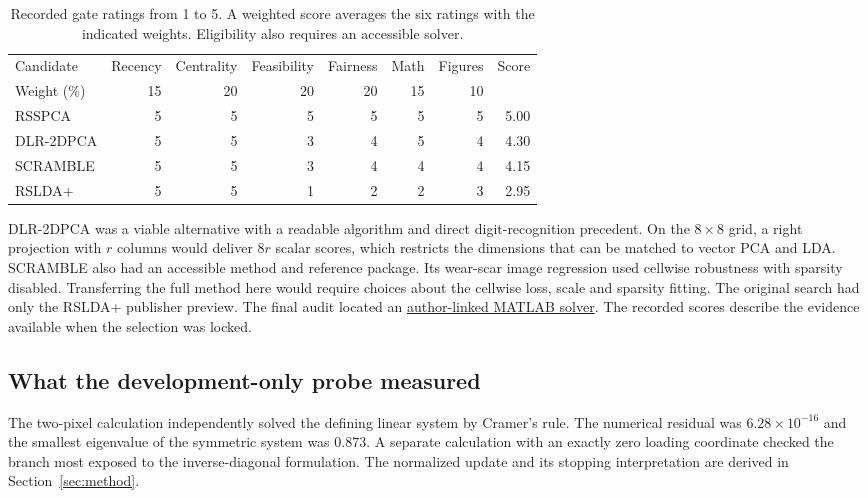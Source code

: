 \documentclass[11pt,a4paper]{article}
\begin{document}
\begin{table}[H]\small\centering
\caption{Recorded gate ratings from 1 to 5. A weighted score averages the six ratings with the indicated weights. Eligibility also requires an accessible solver.}
\label{tab:gate-scores}
\setlength{\tabcolsep}{5pt}
\begin{tabular}{@{}lrrrrrrr@{}}
\toprule
Candidate & Recency & Centrality & Feasibility & Fairness & Math & Figures & Score\\
Weight (\%) & 15 & 20 & 20 & 20 & 15 & 10 & \\
\midrule
RSSPCA & 5 & 5 & 5 & 5 & 5 & 5 & 5.00\\
DLR-2DPCA & 5 & 5 & 3 & 4 & 5 & 4 & 4.30\\
SCRAMBLE & 5 & 5 & 3 & 4 & 4 & 4 & 4.15\\
RSLDA+ & 5 & 5 & 1 & 2 & 2 & 3 & 2.95\\
\bottomrule
\end{tabular}
\end{table}

DLR-2DPCA was a viable alternative with a readable algorithm and direct digit-recognition precedent. On the $8\times8$ grid, a right projection with $r$ columns would deliver $8r$ scalar scores, which restricts the dimensions that can be matched to vector PCA and LDA. SCRAMBLE also had an accessible method and reference package. Its wear-scar image regression used cellwise robustness with sparsity disabled. Transferring the full method here would require choices about the cellwise loss, scale and sparsity fitting. The original search had only the RSLDA+ publisher preview. The final audit located an \href{https://github.com/EMXlight/RSLDAplus}{author-linked MATLAB solver}. The recorded scores describe the evidence available when the selection was locked.

\subsection{What the development-only probe measured}

The two-pixel calculation independently solved the defining linear system by Cramer's rule. The numerical residual was $6.28\times10^{-16}$ and the smallest eigenvalue of the symmetric system was $0.873$. A separate calculation with an exactly zero loading coordinate checked the branch most exposed to the inverse-diagonal formulation. The normalized update and its stopping interpretation are derived in Section~\ref{sec:method}.
\end{document}
